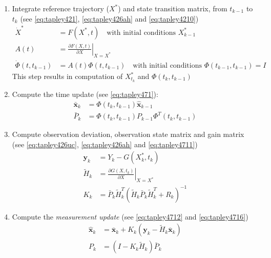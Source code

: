 \begin{enumerate}
  \item \label{en:kalman-wf-item1} Integrate reference trajectory (\(X^*\)) and 
  state transition matrix, from \(t_{k-1}\) to \(t_k\) (see \ref{eq:tapley421}, \ref{eq:tapley426ah} and \ref{eq:tapley4210})
    \begin{subequations}
    \begin{align}
      \dot{X}^* &= F( X^* , t ) 
        \quad \text{with initial conditions } X^*_{k-1} \label{eq:tapley4717a} \\
      A(t) &= 
        \left.\frac{\partial F(X,t)}{\partial X}\right|_{X=X^*} \\
      \dot{\Phi} (t, t_{k-1}) &= 
        A(t) \Phi (t,t_{k-1}) 
        \quad \text{with initial conditions } \Phi(t_{k-1}, t_{k-1}) = I\label{eq:tapley4717b}
    \end{align}
    \end{subequations}
    This step results in computation of \(X^*_{t_k}\) and \(\Phi (t_k, t_{k-1})\)

  \item \label{en:kalman-wf-time-update} Compute the time update (see \ref{eq:tapley471}):
    \begin{subequations}
    \begin{align}
      \bar{\bm{x}}_k &= \Phi (t_k , t_{k-1}) \hat{\bm{x}}_{k-1} \\
      \bar{P}_k &= \Phi (t_k , t_{k-1}) P_{k-1} \Phi ^T (t_k , t_{k-1})
    \end{align}
    \end{subequations}

  \item Compute observation deviation, observation state matrix and gain matrix (see \ref{eq:tapley426uc}, \ref{eq:tapley426ah} and \ref{eq:tapley4711})
    \begin{subequations}
    \begin{align}
      \bm{y}_k &= Y_k - G(X^*_k , t_k ) \\
      \tilde{H}_k &= \left.\frac{\partial G(X , t_k )}{\partial X} \right|_{X=X^*} \\
      K_k & = 
        \bar{P}_k \tilde{H}^T_k 
          \left( \tilde{H}_k \bar{P}_k \tilde{H}^T_k + R_k \right) ^{-1}
    \end{align}
    \end{subequations}

  \item Compute the \emph{measurement update} (see \ref{eq:tapley4712} and \ref{eq:tapley4716})
    \begin{subequations}
    \begin{align}
\hat{\bm{x}}_k &= \bar{\bm{x}}_k + K_k \left( \bm{y}_k - \tilde{H}_k \bar{\bm{x}}_k \right) \\
P_k &= \left( I - K_k \tilde{H}_k \right) \bar{P}_k
    \end{align}
    \end{subequations}


\end{enumerate}
